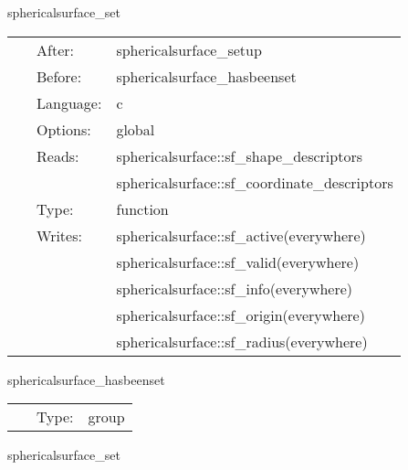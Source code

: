 
\hspace{5mm} sphericalsurface\_set 

\hspace{5mm}{\it set surface radii to be used for initial setup in other thorns } 


\hspace{5mm}

 \begin{tabular*}{160mm}{cll} 
~ & After:  & sphericalsurface\_setup \\ 
~ & Before:  & sphericalsurface\_hasbeenset \\ 
~ & Language:  & c \\ 
~ & Options:  & global \\ 
~ & Reads:  & sphericalsurface::sf\_shape\_descriptors \\ 
~& ~ &sphericalsurface::sf\_coordinate\_descriptors\\ 
~ & Type:  & function \\ 
~ & Writes:  & sphericalsurface::sf\_active(everywhere) \\ 
~& ~ &sphericalsurface::sf\_valid(everywhere)\\ 
~& ~ &sphericalsurface::sf\_info(everywhere)\\ 
~& ~ &sphericalsurface::sf\_origin(everywhere)\\ 
~& ~ &sphericalsurface::sf\_radius(everywhere)\\ 
\end{tabular*} 


\vspace{5mm}


\hspace{5mm} sphericalsurface\_hasbeenset 

\hspace{5mm}{\it set the spherical surfaces before this group, and use it afterwards } 


\hspace{5mm}

 \begin{tabular*}{160mm}{cll} 
~ & Type:  & group \\ 
\end{tabular*} 


\vspace{5mm}


\hspace{5mm} sphericalsurface\_set 

